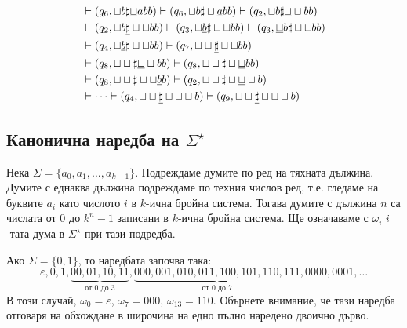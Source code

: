 \begin{example}
\begin{align*}
                                     & \vdash (q_6, \sqcup b \sharp \underline{\sqcup} abb) \vdash (q_6, \sqcup b \sharp \sqcup \underline{a}bb) \vdash (q_2, \sqcup b \sharp \underline{\sqcup}\sqcup bb)\\
                                     & \vdash (q_2, \sqcup b \underline{\sharp} \sqcup\sqcup bb) \vdash (q_3, \sqcup \underline{b} \sharp \sqcup\sqcup bb) \vdash (q_3, \underline{\sqcup} b \sharp \sqcup\sqcup bb)\\
                                     & \vdash (q_4,  \sqcup \underline{b} \sharp \sqcup\sqcup bb) \vdash (q_7, \sqcup \sqcup \underline{\sharp} \sqcup\sqcup bb) \\
                                     & \vdash (q_8, \sqcup \sqcup \sharp \underline{\sqcup}\sqcup bb) \vdash (q_8, \sqcup \sqcup \sharp \sqcup \underline{\sqcup} bb) \\
                                     & \vdash (q_8, \sqcup \sqcup \sharp \sqcup \sqcup \underline{b}b) \vdash (q_2, \sqcup \sqcup \sharp \sqcup \underline{\sqcup} \sqcup b)\\
                                     & \vdash \cdots \vdash (q_4, \sqcup\sqcup\underline{\sharp}\sqcup\sqcup\sqcup b) \vdash (q_9, \sqcup\sqcup\underline{\sharp}\sqcup\sqcup\sqcup b)
  \end{align*}
\end{example}

\subsection*{Канонична наредба на $\Sigma^\star$}

Нека $\Sigma = \{a_0,a_1,\dots,a_{k-1}\}$.
Подреждаме думите по ред на тяхната дължина.
Думите с еднаква дължина подреждаме по техния числов ред, т.е.
гледаме на буквите $a_i$ като числото $i$ в $k$-ична бройна система.
Тогава думите с дължина $n$ са числата от $0$ до $k^n-1$ записани в $k$-ична бройна система.
Ще означаваме с $\omega_i$ $i$-тата дума в $\Sigma^\star$ при тази подредба.

Ако $\Sigma = \{0,1\}$, то наредбата започва така:
\[\varepsilon, 0, 1, \underbrace{00, 01, 10, 11}_{\text{от $0$ до $3$}}, \underbrace{000, 001, 010, 011, 100, 101, 110, 111}_{\text{от $0$ до $7$}}, 0000, 0001, \dots\]
В този случай, $\omega_0 = \varepsilon$, $\omega_7 = 000$, $\omega_{13} = 110$.
Обърнете внимание, че тази наредба отговаря на обхождане в широчина на едно пълно наредено двоично дърво.

